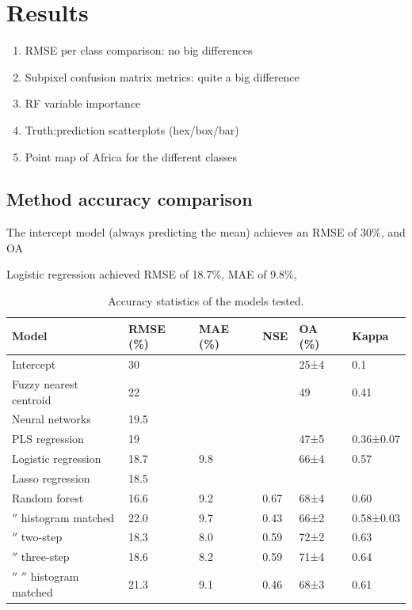\documentclass[a4paper,10pt]{article}
\begin{document}
\section{Results}

\begin{enumerate}
 \item RMSE per class comparison: no big differences
 \item Subpixel confusion matrix metrics: quite a big difference
 \item RF variable importance
 \item Truth:prediction scatterplots (hex/box/bar)
 \item Point map of Africa for the different classes
\end{enumerate}

\subsection{Method accuracy comparison}

The intercept model (always predicting the mean) achieves an \ac{RMSE} of 30\%, and \ac{OA}

Logistic regression achieved RMSE of 18.7\%, MAE of 9.8\%, 

\begin{table}
\centering
\begin{tabular}{llllll}
\toprule
\textbf{Model} & \textbf{\ac{RMSE} (\%)} & \textbf{\ac{MAE} (\%)} & \textbf{\acrshort{NSE}} & \textbf{\ac{OA} (\%)} & \textbf{Kappa} \\
\midrule
Intercept
& 30    &       &       & 25±4  & 0.1       \\
Fuzzy nearest centroid
& 22    &       &       & 49    & 0.41      \\
Neural networks
& 19.5  &       &       &       &           \\
PLS regression
& 19    &       &       & 47±5  & 0.36±0.07 \\
Logistic regression
& 18.7  & 9.8   &       & 66±4  & 0.57      \\
Lasso regression
& 18.5  &       &       &       &           \\
Random forest
& 16.6  & 9.2   & 0.67  & 68±4  & 0.60      \\
\ensuremath{''} histogram matched
& 22.0  & 9.7   & 0.43  & 66±2  & 0.58±0.03 \\
\ensuremath{''} two-step
& 18.3  & 8.0   & 0.59  & 72±2  & 0.63      \\
\ensuremath{''} three-step
& 18.6  & 8.2   & 0.59  & 71±4  & 0.64      \\
\ensuremath{''} \ensuremath{''} histogram matched
& 21.3  & 9.1   & 0.46  & 68±3  & 0.61      \\
\bottomrule
\end{tabular}
\caption{Accuracy statistics of the models tested.}
\label{tab-accuracy}
\end{table}
\end{document}

